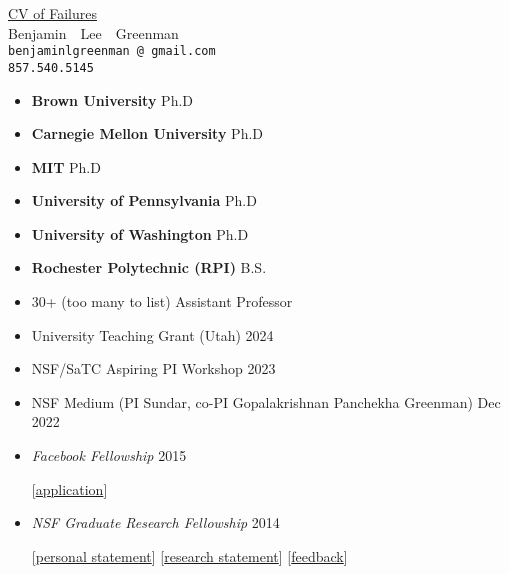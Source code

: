 \documentclass{article}
\makeatletter
\renewcommand{\maketitle}{
\begin{center}
  {\large{\href{https://www.princeton.edu/~joha/Johannes\_Haushofer\_CV\_of\_Failures.pdf}{CV of Failures}} \\
   \large{Benjamin~~Lee~~Greenman}}
\\\texttt{benjaminlgreenman\,@\,gmail.com}
\\\texttt{857.540.5145}
\end{center}
}
\makeatother
\begin{document}
\maketitle

{\centering{}}



\begin{itemize}
\item {\bf Brown University} \hfill Ph.D
\item {\bf Carnegie Mellon University} \hfill Ph.D
\item {\bf MIT} \hfill Ph.D
\item {\bf University of Pennsylvania} \hfill Ph.D
\item {\bf University of Washington} \hfill Ph.D
\item {\bf Rochester Polytechnic (RPI)} \hfill B.S.
\end{itemize}


\begin{itemize}
  \item 30+ (too many to list)  \hfill Assistant Professor
\end{itemize}


\begin{itemize}
  \item University Teaching Grant (Utah) \hfill 2024
\item NSF/SaTC Aspiring PI Workshop \hfill 2023
\item NSF Medium (PI Sundar, co-PI Gopalakrishnan Panchekha Greenman) \hfill Dec 2022
\item \emph{Facebook Fellowship} \hfill 2015
\item[] [\href{http://cs.utah.edu/~blg/cv/failures/facebook-2015-reject.pdf}{application}]
\item \emph{NSF Graduate Research Fellowship} \hfill 2014
\item[] [\href{https://cs.utah.edu/~blg/cv/failures/nsf-2014-personal-reject.pdf}{personal statement}]
        [\href{https://cs.utah.edu/~blg/cv/failures/nsf-2014-research-reject.pdf}{research statement}]
        [\href{https://cs.utah.edu/~blg/cv/failures/nsf-2014-reject-response.pdf}{feedback}]
\end{itemize}
\end{document}
